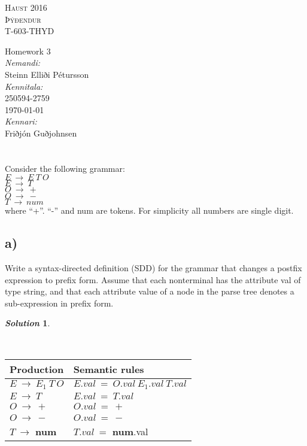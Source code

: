 \documentclass[11pt, a4paper]{article}
\newtheorem*{solution}{\emph{Solution}}
\begin{document}
\begin{titlepage}
\begin{center}

\textsc{\huge Haust 2016}\\[1.5cm]

\textsc{\huge Þýðendur}\\[0.2cm]
\textsc{\huge T-603-THYD}\\[1.5cm]

\end{center}
{ \huge Homework 3\\[1.5cm] }
\Large {
\emph{Nemandi:}\\
Steinn Elliði Pétursson\\[0.5cm]
\emph{Kennitala:}\\
250594-2759\\[0.5cm]
{\large \today}\\[0.5cm]
\emph{Kennari:} \\
Friðjón Guðjohnsen}\\

\end{titlepage}
\leavevmode

\section{}
	Consider the following grammar:\\
		$E~\rightarrow~E~T~O$\\
		$E~\rightarrow~T$\\
		$O~\rightarrow~+$\\
		$O~\rightarrow~-$\\
		$T~\rightarrow~num$\\
	where “+”. “-” and num are tokens. For simplicity all numbers are single digit.\\
	
\subsection*{a)}
	Write a syntax-directed definition (SDD) for the grammar that changes a postfix expression to prefix form. Assume that each nonterminal has the attribute val of type string, and that each attribute value of a node in the parse tree denotes a sub-expression in prefix form.

\begin{solution}\end{solution}~\\
	\begin{tabular}{|l|l|}
	\hline
	\hline
	Production & Semantic rules \\
	\hline
	$E~\rightarrow~E_1~T~O$ & $E.val~=~O.val~E_1.val~T.val$\\
	\hline
	$E~\rightarrow~T$ & $E.val~=~T.val$\\
	\hline
	$O~\rightarrow~+$ & $O.val~=~+$\\
	\hline
	$O~\rightarrow~-$ & $O.val~=~-$\\
	\hline
	$T~\rightarrow$ \textbf{num} & $T.val~=$ \textbf{num}.val\\
	\hline
	\end{tabular}\\
\end{document}
